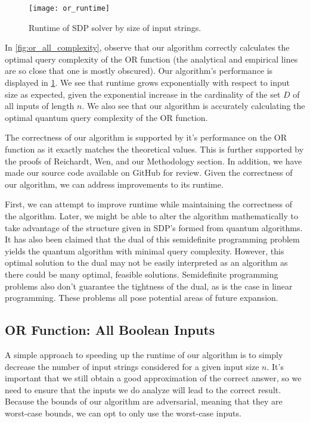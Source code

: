 \begin{figure}[H]
\centering
\texttt{[image: or\_runtime]}
\caption{Runtime of SDP solver by size of input strings.}
\label{fig:or_all_runtime}
\end{figure}

In \cref{fig:or_all_complexity}, observe that our algorithm
correctly calculates the optimal query complexity of the OR function (the
analytical and empirical lines are so close that one
is mostly obscured).
Our algorithm's performance is displayed in \cref{fig:or_all_runtime}.
We see that runtime grows exponentially with respect to input size as expected, 
given the exponential increase in the cardinality of the set $D$ of all
inputs of length $n$. 
We also see that our algorithm is accurately calculating the
optimal quantum query complexity of the OR function. 

The correctness of our algorithm is supported 
by it's performance on the OR function as it 
exactly matches the theoretical values. 
This is further supported by the proofs of Reichardt, 
Wen, and our Methodology section. 
In addition, we have made our source code 
available on GitHub for review. 
Given the correctness of our algorithm, 
we can address improvements to its runtime.

First, we can attempt to improve runtime while
maintaining the correctness of the algorithm. Later,
we might be able to alter the algorithm
mathematically to take advantage of the structure
given in SDP's formed from quantum algorithms. 
It has also been claimed that the dual of this semidefinite
programming problem yields the quantum algorithm with minimal query complexity.
However, this optimal solution to the dual may not be easily 
interpreted as an algorithm as there could be many optimal, feasible solutions. 
Semidefinite programming problems also don't guarantee the tightness of the dual,
as is the case in linear programming. 
These problems all pose potential areas of future expansion.

\subsection{OR Function: All Boolean Inputs}

A simple approach to speeding up the runtime of our
algorithm is to simply decrease the number of input
strings considered for a given input size $n$. It's
important that we still obtain a good approximation
of the correct answer, so we need to ensure that the
inputs we do analyze will lead to the correct result.
Because the bounds of our algorithm are adversarial,
meaning that they are worst-case bounds, we can opt
to only use the worst-case inputs.

